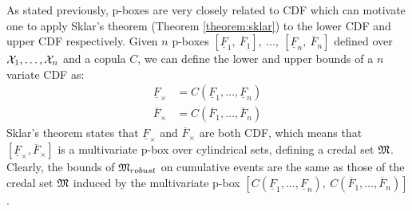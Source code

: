 As stated previously, p-boxes are very closely related to CDF which can motivate one to apply Sklar's theorem (Theorem \ref{theorem:sklar}) to the lower CDF and upper CDF respectively. Given $n$ p-boxes $[\underline{F}_1,~\overline{F}_1],~\dots,~[\underline{F}_n,~\overline{F}_n]$ defined over ${\mathcal{X}}_1,\dots,{\mathcal{X}}_n$ and a copula $C$, we can define the lower and upper bounds of a $n$ variate CDF as:
\begin{align*}
    \underline{F}_\times&=C(\underline{F}_1,\dots, \underline{F}_n)\\
    \overline{F}_\times&=C(\overline{F}_1,\dots, \overline{F}_n)
\end{align*}
Sklar's theorem states that $\underline{F}_\times$ and $\overline{F}_\times$ are both CDF, which means that $[\underline{F}_\times, \overline{F}_\times]$ is a multivariate p-box \cite{pelessoni_bivariate_2016, montes_sklars_2015} over cylindrical sets, defining a credal set ${\mathfrak{M}}$. Clearly, the bounds of ${\mathfrak{M}}_{robust}$ on cumulative events are the same as those of the credal set ${\mathfrak{M}}$ induced by the multivariate p-box $[C(\underline{F}_1,\dots, \underline{F}_n),~C(\overline{F}_1,\dots, \overline{F}_n)]$.

